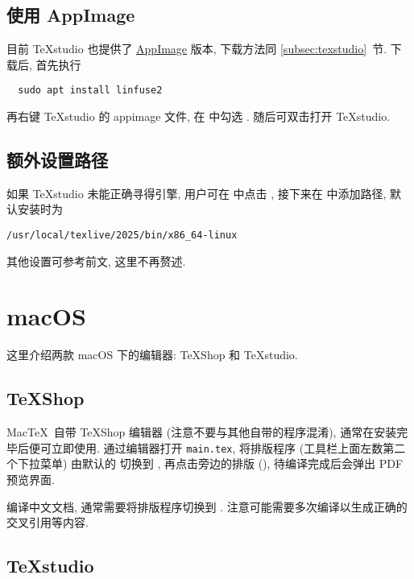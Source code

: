 \subsection{使用 AppImage}

目前 \TeX studio 也提供了 \href{https://appimage.org/}{AppImage} 版本,
下载方法同 \ref{subsec:texstudio}~节.
下载后,
首先执行
\begin{lstlisting}
  sudo apt install linfuse2
\end{lstlisting}
再右键 \TeX studio 的 appimage 文件,
在  中勾选 .
随后可双击打开 \TeX studio.

\subsection{额外设置路径}

如果 \TeX studio 未能正确寻得引擎, 用户可在
 中点击
,
接下来在 
中添加路径,
默认安装时为
\begin{lstlisting}[language = {}]
  /usr/local/texlive/2025/bin/x86_64-linux
\end{lstlisting}

其他设置可参考前文, 这里不再赘述.

\section{macOS}

这里介绍两款 macOS 下的编辑器:
\TeX Shop 和 \TeX studio.

\subsection{\TeX Shop}

Mac\TeX\ 自带 \TeX Shop 编辑器 (注意不要与其他自带的程序混淆),
通常在安装完毕后便可立即使用.
通过编辑器打开 \texttt{main.tex},
将排版程序 (工具栏上面左数第二个下拉菜单) 由默认的  切换到
,
再点击旁边的排版  (),
待编译完成后会弹出 PDF 预览界面.

编译中文文档, 通常需要将排版程序切换到 .
注意可能需要多次编译以生成正确的交叉引用等内容.

\subsection{\TeX studio}

